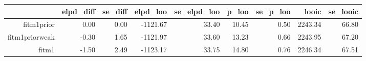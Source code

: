 \begin{table}[ht]
\centering
\begin{tabular}{rrrrrrrrr}
  \hline
 & elpd\_diff & se\_diff & elpd\_loo & se\_elpd\_loo & p\_loo & se\_p\_loo & looic & se\_looic \\ 
  \hline
fitm1prior & 0.00 & 0.00 & -1121.67 & 33.40 & 10.45 & 0.50 & 2243.34 & 66.80 \\ 
  fitm1priorweak & -0.30 & 1.65 & -1121.97 & 33.60 & 13.23 & 0.66 & 2243.95 & 67.20 \\ 
  fitm1 & -1.50 & 2.49 & -1123.17 & 33.75 & 14.80 & 0.76 & 2246.34 & 67.51 \\ 
   \hline
\end{tabular}
\end{table}
